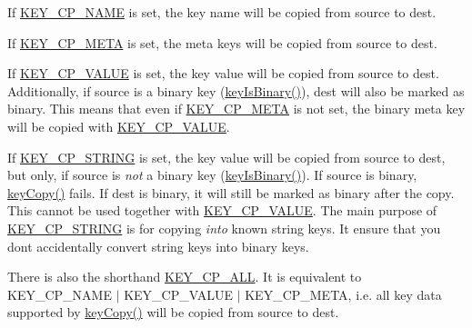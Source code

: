 \begin{DoxyItemize}
\item If \hyperlink{group__key_gga9ff42b1e9a97222562bfda3dd1f8c735ab41d70eb97ae5480333e85759318b5a9}{K\+E\+Y\+\_\+\+C\+P\+\_\+\+N\+A\+ME} is set, the key name will be copied from {\ttfamily source} to {\ttfamily dest}.
\item If \hyperlink{group__key_gga9ff42b1e9a97222562bfda3dd1f8c735a6b8bdcae98a0f29d66a6b3d1651cbac6}{K\+E\+Y\+\_\+\+C\+P\+\_\+\+M\+E\+TA} is set, the meta keys will be copied from {\ttfamily source} to {\ttfamily dest}.
\item If \hyperlink{group__key_gga9ff42b1e9a97222562bfda3dd1f8c735a3043a92bfbe465ccff7624e54d89bcf8}{K\+E\+Y\+\_\+\+C\+P\+\_\+\+V\+A\+L\+UE} is set, the key value will be copied from {\ttfamily source} to {\ttfamily dest}. Additionally, if {\ttfamily source} is a binary key (\hyperlink{group__keytest_ga9526b371087564e43e3dff8ad0dac949}{key\+Is\+Binary()}), {\ttfamily dest} will also be marked as binary. This means that even if \hyperlink{group__key_gga9ff42b1e9a97222562bfda3dd1f8c735a6b8bdcae98a0f29d66a6b3d1651cbac6}{K\+E\+Y\+\_\+\+C\+P\+\_\+\+M\+E\+TA} is not set, the {\ttfamily binary} meta key will be copied with \hyperlink{group__key_gga9ff42b1e9a97222562bfda3dd1f8c735a3043a92bfbe465ccff7624e54d89bcf8}{K\+E\+Y\+\_\+\+C\+P\+\_\+\+V\+A\+L\+UE}.
\item If \hyperlink{group__key_gga9ff42b1e9a97222562bfda3dd1f8c735a57996652569a901d4e7e58c33f7b3631}{K\+E\+Y\+\_\+\+C\+P\+\_\+\+S\+T\+R\+I\+NG} is set, the key value will be copied from {\ttfamily source} to {\ttfamily dest}, but only, if {\ttfamily source} is {\itshape not} a binary key (\hyperlink{group__keytest_ga9526b371087564e43e3dff8ad0dac949}{key\+Is\+Binary()}). If {\ttfamily source} is binary, \hyperlink{group__key_ga505575ebef060066984fe0f590081e37}{key\+Copy()} fails. If {\ttfamily dest} is binary, it will still be marked as binary after the copy. This cannot be used together with \hyperlink{group__key_gga9ff42b1e9a97222562bfda3dd1f8c735a3043a92bfbe465ccff7624e54d89bcf8}{K\+E\+Y\+\_\+\+C\+P\+\_\+\+V\+A\+L\+UE}. The main purpose of \hyperlink{group__key_gga9ff42b1e9a97222562bfda3dd1f8c735a57996652569a901d4e7e58c33f7b3631}{K\+E\+Y\+\_\+\+C\+P\+\_\+\+S\+T\+R\+I\+NG} is for copying {\itshape into} known string keys. It ensure that you don\textquotesingle{}t accidentally convert string keys into binary keys.
\end{DoxyItemize}

There is also the shorthand \hyperlink{group__key_gga9ff42b1e9a97222562bfda3dd1f8c735a3e04e17514f102f1e9217308d44e7612}{K\+E\+Y\+\_\+\+C\+P\+\_\+\+A\+LL}. It is equivalent to {\ttfamily K\+E\+Y\+\_\+\+C\+P\+\_\+\+N\+A\+ME $\vert$ K\+E\+Y\+\_\+\+C\+P\+\_\+\+V\+A\+L\+UE $\vert$ K\+E\+Y\+\_\+\+C\+P\+\_\+\+M\+E\+TA}, i.\+e. all key data supported by \hyperlink{group__key_ga505575ebef060066984fe0f590081e37}{key\+Copy()} will be copied from {\ttfamily source} to {\ttfamily dest}.

